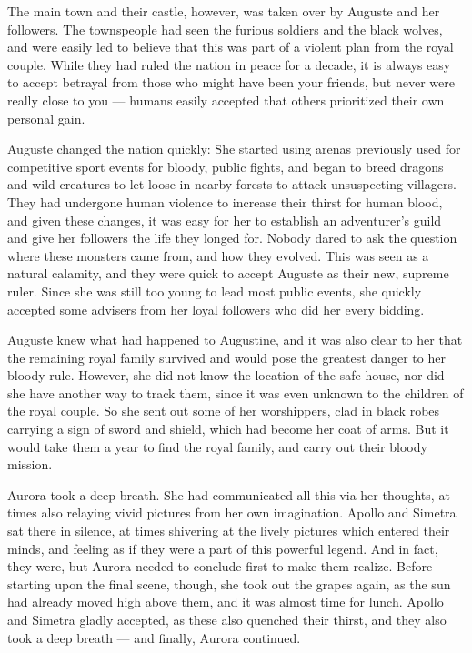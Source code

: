The main town and their castle, however, was taken over by Auguste and her followers. The townspeople had seen the furious soldiers and the black wolves, and were easily led to believe that this was part of a violent plan from the royal couple. While they had ruled the nation in peace for a decade, it is always easy to accept betrayal from those who might have been your friends, but never were really close to you --- humans easily accepted that others prioritized their own personal gain.

Auguste changed the nation quickly: She started using arenas previously used for competitive sport events for bloody, public fights, and began to breed dragons and wild creatures to let loose in nearby forests to attack unsuspecting villagers. They had undergone human violence to increase their thirst for human blood, and given these changes, it was easy for her to establish an adventurer's guild and give her followers the life they longed for. Nobody dared to ask the question where these monsters came from, and how they evolved. This was seen as a natural calamity, and they were quick to accept Auguste as their new, supreme ruler. Since she was still too young to lead most public events, she quickly accepted some advisers from her loyal followers who did her every bidding.

Auguste knew what had happened to Augustine, and it was also clear to her that the remaining royal family survived and would pose the greatest danger to her bloody rule. However, she did not know the location of the safe house, nor did she have another way to track them, since it was even unknown to the children of the royal couple. So she sent out some of her worshippers, clad in black robes carrying a sign of sword and shield, which had become her coat of arms. But it would take them a year to find the royal family, and carry out their bloody mission.

\froufrou{}

Aurora took a deep breath. She had communicated all this via her thoughts, at times also relaying vivid pictures from her own imagination. Apollo and Simetra sat there in silence, at times shivering at the lively pictures which entered their minds, and feeling as if they were a part of this powerful legend. And in fact, they were, but Aurora needed to conclude first to make them realize. Before starting upon the final scene, though, she took out the grapes again, as the sun had already moved high above them, and it was almost time for lunch. Apollo and Simetra gladly accepted, as these also quenched their thirst, and they also took a deep breath --- and finally, Aurora continued.

